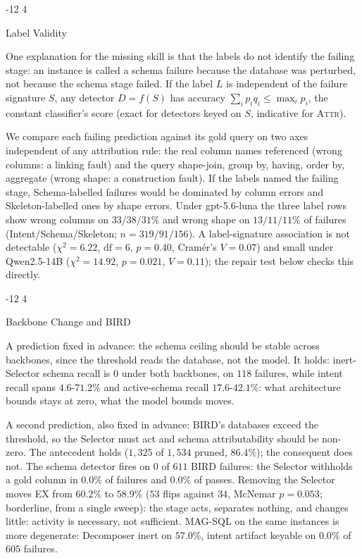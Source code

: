 \documentclass{llncs}
\makeatletter
\renewcommand\subsubsection{\@startsection{subsubsection}{3}{\z@}%
  {-12\p@ \@plus -4\p@ \@minus -4\p@}%
  {4\p@ \@plus 2\p@ \@minus 2\p@}%
  {\normalfont\normalsize\bfseries\boldmath\raggedright}}
\makeatother
\begin{document}
\subsubsection{Label Validity}
\label{sec:labels}

One explanation for the missing skill is that the labels do not identify the
failing stage: an instance is called a schema failure because the database
was perturbed, not because the schema stage failed. If the label $L$ is independent of the failure signature
$S$, any detector $D = f(S)$ has accuracy $\sum_i p_i q_i \le \max_i p_i$,
the constant classifier's score (exact for detectors keyed on $S$,
indicative for \textsc{Attr}).

We compare each failing prediction against its gold query on two axes
independent of any attribution rule: the real column names referenced (wrong
columns: a linking fault) and the query shape-join, group by, having, order
by, aggregate (wrong shape: a construction fault). If the labels named the
failing stage, Schema-labelled failures would be dominated by column errors
and Skeleton-labelled ones by shape errors. Under gpt-5.6-luna the three label rows show
wrong columns on $33/38/31\%$ and wrong shape on $13/11/11\%$ of failures
(Intent/Schema/Skeleton; $n = 319/91/156$). A label-signature association
is not detectable ($\chi^2 = 6.22$, $\mathrm{df} = 6$, $p = 0.40$, Cram\'er's
$V = 0.07$) and small under Qwen2.5-14B ($\chi^2 = 14.92$, $p = 0.021$,
$V = 0.11$); the repair test below checks this directly.

\subsubsection{Backbone Change and BIRD}
\label{sec:bird}

A prediction fixed in advance: the schema ceiling should be stable across
backbones, since the threshold reads the database, not the model. It holds:
inert-Selector schema recall is $0$ under both backbones, on $118$ failures,
while intent recall spans $4.6$-$71.2\%$ and active-schema recall
$17.6$-$42.1\%$: what architecture bounds stays at zero, what the model
bounds moves.

A second prediction, also fixed in advance: BIRD's databases exceed the
threshold, so the Selector must act and schema attributability should be
non-zero. The antecedent holds ($1{,}325$ of $1{,}534$ pruned, $86.4\%$);
the consequent does not. The schema detector fires on $0$ of $611$ BIRD
failures: the Selector withholds a gold column in $0.0\%$ of failures and
$0.0\%$ of passes. Removing the Selector moves EX from $60.2\%$ to
$58.9\%$ ($53$ flips against $34$, McNemar $p = 0.053$; borderline, from a
single sweep): the stage acts, separates nothing, and changes little: activity is
necessary, not sufficient. MAG-SQL on the same
instances is more degenerate: Decomposer inert on $57.0\%$, intent artifact
keyable on $0.0\%$ of $605$ failures.
\end{document}
